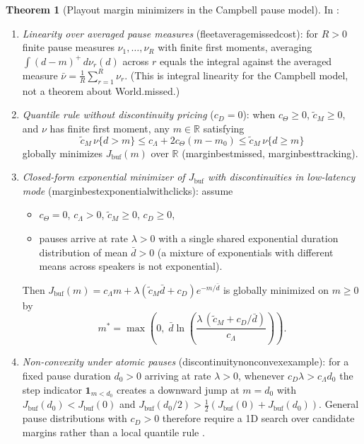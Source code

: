 \documentclass[11pt,a4paper]{article}
\DeclareRobustCommand{\lean}[1]{{\ttfamily\def\_{\textunderscore\allowbreak}#1}}
\newcommand{\R}{\mathbb{R}}
\theoremstyle{definition}
\newtheorem{theorem}[definition]{Theorem}
\begin{document}
\begin{theorem}[Playout margin minimizers in the Campbell pause model]
\label{thm:level}
In :
\begin{enumerate}
\item \emph{Linearity over averaged pause measures}
  (\lean{fleet\_average\_missed\_cost}): for $R > 0$ finite pause measures
  $\nu_1, \dots, \nu_R$ with finite first moments, averaging
  $\int (d - m)^+\,d\nu_r(d)$ across $r$ equals the integral against the
  averaged measure $\bar\nu = \frac{1}{R}\sum_{r=1}^R \nu_r$. (This is integral
  linearity for the Campbell model, not a theorem about \lean{World.missed}.)
\item \emph{Quantile rule without discontinuity pricing} ($c_D = 0$):
  when $c_\Theta \ge 0$, $\tilde c_M \ge 0$, and $\nu$ has finite first moment,
  any $m \in \R$ satisfying
  \[
    \tilde c_M\,\nu\{d > m\} \le c_\Lambda + 2 c_\Theta (m - m_0)
    \le \tilde c_M\,\nu\{d \ge m\}
  \]
  globally minimizes $J_{\mathrm{buf}}(m)$ over $\R$ (\lean{margin\_best\_missed},
  \lean{margin\_best\_tracking}).
\item \emph{Closed-form exponential minimizer of $J_{\mathrm{buf}}$ with discontinuities in low-latency
  mode} (\lean{margin\_best\_exponential\_with\_clicks}): assume
  \begin{itemize}
  \item $c_\Theta = 0$, $c_\Lambda > 0$, $\tilde c_M \ge 0$, $c_D \ge 0$,
  \item pauses arrive at rate $\lambda > 0$ with a single shared exponential
    duration distribution of mean $\bar d > 0$ (a mixture of exponentials with
    different means across speakers is not exponential).
  \end{itemize}
  Then $J_{\mathrm{buf}}(m) = c_\Lambda m + \lambda(\tilde c_M \bar d + c_D) e^{-m / \bar d}$
  is globally minimized on $m \ge 0$ by
  \[
    m^* = \max\!\left(0,\;
      \bar d \ln\!\left(\frac{\lambda\,(\tilde c_M + c_D / \bar d)}{c_\Lambda}\right)\right) .
  \]
\item \emph{Non-convexity under atomic pauses}
  (\lean{discontinuity\_nonconvex\_example}): for a fixed pause duration
  $d_0 > 0$ arriving at rate $\lambda > 0$, whenever $c_D \lambda > c_\Lambda d_0$
  the step indicator $\mathbf{1}_{m < d_0}$ creates a downward jump at $m = d_0$
  with $J_{\mathrm{buf}}(d_0) < J_{\mathrm{buf}}(0)$ and
  $J_{\mathrm{buf}}(d_0/2) > \frac{1}{2}(J_{\mathrm{buf}}(0) + J_{\mathrm{buf}}(d_0))$.
  General pause distributions with $c_D > 0$ therefore require a 1D search over
  candidate margins rather than a local quantile rule \cite{unisono-spec}.
\end{enumerate}
\end{theorem}
\end{document}

